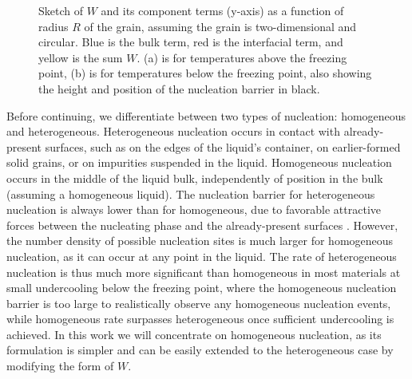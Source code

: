 \begin{figure}[h]
    \centering
{}
\caption{Sketch of $W$ and its component terms (y-axis) as a function of radius $R$ of the grain, assuming the grain is two-dimensional and circular. Blue is the bulk term, red is the interfacial term, and yellow is the sum $W$. (a) is for temperatures above the freezing point, (b) is for temperatures below the freezing point, also showing the height and position of the nucleation barrier in black.}\label{fig:nuc_work}
\end{figure}

Before continuing, we differentiate between two types of nucleation: homogeneous and heterogeneous. Heterogeneous nucleation occurs in contact with already-present surfaces, such as on the edges of the liquid's container, on earlier-formed solid grains, or on impurities suspended in the liquid. Homogeneous nucleation occurs in the middle of the liquid bulk, independently of position in the bulk (assuming a homogeneous liquid). The nucleation barrier for heterogeneous nucleation is always lower than for homogeneous, due to favorable attractive forces between the nucleating phase and the already-present surfaces \cite{sear07}. However, the number density of possible nucleation sites is much larger for homogeneous nucleation, as it can occur at any point in the liquid. The rate of heterogeneous nucleation is thus much more significant than homogeneous in most materials at small undercooling below the freezing point, where the homogeneous nucleation barrier is too large to realistically observe any homogeneous nucleation events, while homogeneous rate surpasses heterogeneous once sufficient undercooling is achieved. In this work we will concentrate on homogeneous nucleation, as its formulation is simpler and can be easily extended to the heterogeneous case by modifying the form of $W$.


